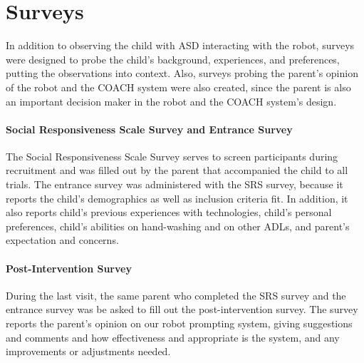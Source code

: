 \section{Surveys}
In addition to observing the child with ASD interacting with the robot, surveys were designed to probe the child's background, experiences, and preferences, putting the observations into context.  Also, surveys probing the parent's opinion of the robot and the COACH system were also created, since the parent is also an important decision maker in the robot and the COACH system's design.

\paragraph{Social Responsiveness Scale Survey and Entrance Survey}
The Social Responsiveness Scale Survey serves to screen participants during recruitment and was filled out by the parent that accompanied the child to all trials.  The entrance survey was administered with the SRS survey, because it reports the child's demographics as well as inclusion criteria fit.  In addition, it also reports child's previous experiences with technologies, child's personal preferences, child's abilities on hand-washing and on other ADLs, and parent's expectation and concerns.

\paragraph{Post-Intervention Survey}
During the last visit, the same parent who completed the SRS survey and the entrance survey was be asked to fill out the post-intervention survey.  The survey reports the parent's opinion on our robot prompting system, giving suggestions and comments and how effectiveness and appropriate is the system, and any improvements or adjustments needed.
